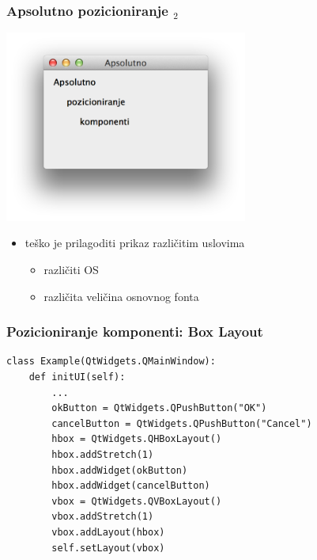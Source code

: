\documentclass[utf8,compress]{beamer}
\begin{document}
\begin{frame}
  \frametitle{Apsolutno pozicioniranje $_2$}
\begin{center}
\includegraphics[width=8cm]{pyqt05.png}
\end{center}
  \begin{itemize}
    \item teško je prilagoditi prikaz različitim uslovima
    \begin{itemize}
      \item različiti OS
      \item različita veličina osnovnog fonta
    \end{itemize}
  \end{itemize}
\end{frame}

\begin{frame}[fragile]
  \frametitle{Pozicioniranje komponenti: Box Layout}
\begin{verbatim}
class Example(QtWidgets.QMainWindow):
    def initUI(self):
        ...
        okButton = QtWidgets.QPushButton("OK")
        cancelButton = QtWidgets.QPushButton("Cancel")
        hbox = QtWidgets.QHBoxLayout()
        hbox.addStretch(1)
        hbox.addWidget(okButton)
        hbox.addWidget(cancelButton)
        vbox = QtWidgets.QVBoxLayout()
        vbox.addStretch(1)
        vbox.addLayout(hbox)
        self.setLayout(vbox)    
\end{verbatim}
\end{frame}
\end{document}
